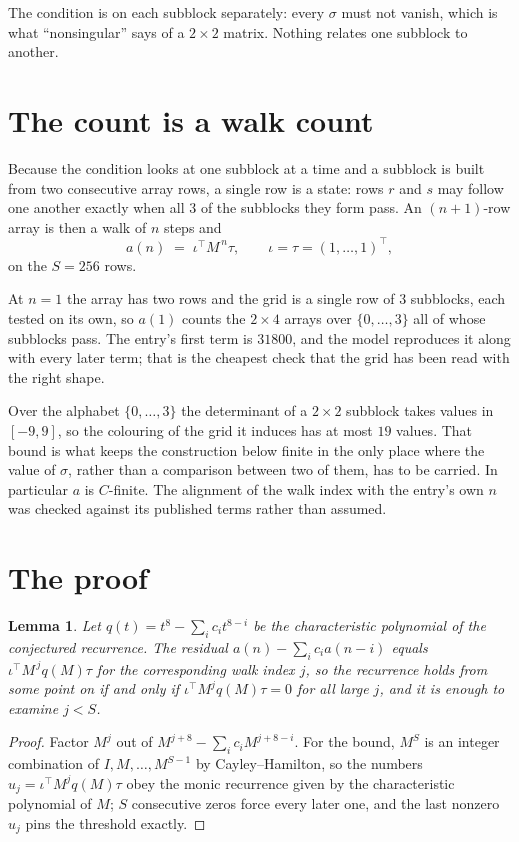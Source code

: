\documentclass[11pt,a4paper]{article}
\theoremstyle{plain}
\newtheorem{lemma}[theorem]{Lemma}
\theoremstyle{definition}
\begin{document}
The condition is on each subblock separately: every $\sigma$ must not vanish, which is what
``nonsingular'' says of a $2\times2$ matrix. Nothing
relates one subblock to another.

\section{The count is a walk count}

Because the condition looks at one subblock at a time and a subblock is
built from two consecutive array rows, a single row is a state: rows $r$ and $s$ may follow one
another exactly when all $3$ of the subblocks they form pass. An $(n+1)$-row array is then a
walk of $n$ steps and
\[
a(n)\;=\;\iota^{\!\top}M^{\,n}\tau,\qquad\iota=\tau=(1,\dots,1)^{\!\top},
\]
on the $S=256$ rows.

At $n=1$ the array has two rows and the grid is a single row of $3$
subblocks, each tested on its own, so $a(1)$ counts the
$2\times4$ arrays over $\{0,\dots,3\}$ all of whose subblocks pass. The entry's
first term is $31800$, and the model reproduces it along with every later term; that is the
cheapest check that the grid has been read with the right shape.

Over the alphabet $\{0,\dots,3\}$ the determinant of a $2\times2$ subblock takes values in
$[-9,9]$, so the colouring of the grid it induces has at most $19$ values.
That bound is what keeps the construction below finite in the only place where the value of
$\sigma$, rather than a comparison between two of them, has to be carried.
In particular $a$ is $C$-finite. The alignment of the walk index with the entry's own $n$ was
checked against its published terms rather than assumed.

\section{The proof}

\begin{lemma}\label{lem:crit}
Let $q(t)=t^{8}-\sum_i c_it^{8-i}$ be the characteristic polynomial of the
conjectured recurrence. The residual $a(n)-\sum_ic_ia(n-i)$ equals
$\iota^{\!\top}M^{\,j}q(M)\tau$ for the corresponding walk index $j$, so the recurrence
holds from some point on if and only if $\iota^{\!\top}M^{j}q(M)\tau=0$ for all large $j$,
and it is enough to examine $j<S$.
\end{lemma}

\begin{proof}
Factor $M^{j}$ out of $M^{j+8}-\sum_ic_iM^{j+8-i}$. For the bound, $M^{S}$
is an integer combination of $I,M,\dots,M^{S-1}$ by Cayley--Hamilton, so the numbers
$u_j=\iota^{\!\top}M^{j}q(M)\tau$ obey the monic recurrence given by the characteristic
polynomial of $M$; $S$ consecutive zeros force every later one, and the last nonzero $u_j$
pins the threshold exactly.
\end{proof}
\end{document}
